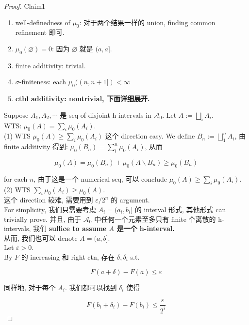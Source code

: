 \begin{proof}

Claim1

\begin{enumerate}
\item
  well-definedness of \(\mu_{0}\): 对于两个结果一样的 union, finding common refinement 即可.
\item
  \(\mu_{0}(\varnothing) = 0\): 因为 \(\varnothing\) 就是 \((a,a\rbrack\).
\item
  finite additivity: trivial.
\item
  \(\sigma\)-finiteness: each \(\mu_{0}((n,n + 1\rbrack) < \infty\)
\item
  \textbf{ctbl additivity: nontrivial, 下面详细展开.}
\end{enumerate}

Suppose \(A_{1},A_{2},\cdots\) 是 seq of disjoint h-intervals in \(\mathcal{A}_{0}\). Let \(A := \bigsqcup_{i}A_{i}\).\\
WTS: \(\mu_{0}(A) = \sum_{i}\mu_{0}(A_{i})\).\\
(1) WTS \(\mu_{0}(A) \geq \sum_{i}\mu_{0}(A_{i})\) 这个 direction easy. We define \(B_{n} := \bigsqcup_{1}^{n}A_{i}\), 由 finite additivity 得到: \(\mu_{0}(B_{n}) = \sum_{i}^{n}\mu_{0}(A_{i})\), 从而

\[\mu_{0}(A) = \mu_{0}(B_{n}) + \mu_{0}(A\backslash B_{n}) \geq \mu_{0}(B_{n})\]

for each \(n\), 由于这是一个 numerical seq, 可以 conclude \(\mu_{0}(A) \geq \sum_{i}\mu_{0}(A_{i})\). (2) WTS \(\sum_{i}\mu_{0}(A_{i}) \geq \mu_{0}(A)\).\\
这个 direction 较难, 需要用到 \(\varepsilon/2^{n}\) 的 argument.\\
For simplicity, 我们只需要考虑 \(A_{i} = (a_{i},b_{i}\rbrack\) 的 interval 形式, 其他形式 can trivially prove. 并且, 由于 \(\mathcal{A}_{0}\) 中任何一个元素至多只有 finite 个离散的 h-intervals, 我们 \textbf{suffice to assume \(A\) 是一个 h-interval.}\\
从而, 我们也可以 denote \(A = (a,b\rbrack\).\\
Let \(\varepsilon > 0\).\\
By \(F\) 的 increasing 和 right ctn, 存在 \(\delta,\delta_{i}\) s.t.

\[F(a + \delta) - F(a) \leq \varepsilon\]

同样地, 对于每个 \(A_{i}\). 我们都可以找到 \(\delta_{i}\) 使得

\[F(b_{i} + \delta_{i}) - F(b_{i}) \leq \frac{\varepsilon}{2^{i}}\]


\end{proof}
